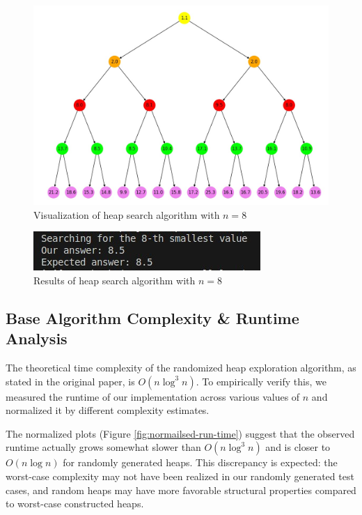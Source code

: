 \documentclass[conference]{IEEEtran}
\begin{document}
\begin{figure}
    \centering
    \includegraphics[width=1\linewidth]{images/algo-visualisation.jpeg}
    \caption{Visualization of heap search algorithm with $n = 8$}
    \label{fig:visualise}
\end{figure}

\begin{figure}
    \centering
    \includegraphics[width=1\linewidth]{images/algo-result.jpeg}
    \caption{Results of heap search algorithm with $n = 8$}
    \label{fig:result}
\end{figure}


\subsection{Base Algorithm Complexity \& Runtime Analysis}

The theoretical time complexity of the randomized heap exploration algorithm, as stated in the original paper, is $O(n \log^3 n)$. To empirically verify this, we measured the runtime of our implementation across various values of $n$ and normalized it by different complexity estimates.

The normalized plots (Figure \ref{fig:normailsed-run-time}) suggest that the observed runtime actually grows somewhat slower than $O(n \log^3 n)$ and is closer to $O(n \log n)$ for randomly generated heaps. This discrepancy is expected: the worst-case complexity may not have been realized in our randomly generated test cases, and random heaps may have more favorable structural properties compared to worst-case constructed heaps.
\end{document}

